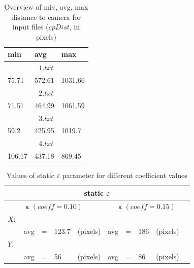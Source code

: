 \begin{table}[htb!]
	\caption{Overview of miv, avg, max distance to camera for input files ($cpDist$, in pixels)}
	\label{table:cp_dist_res}
	
	\setlength{\tabcolsep}{10pt}
	\centering
	
	\begin{tabular}[c]{||C{2cm} C{2cm} C{2cm}||}
		\hline
		min 	& avg	& max 	\\ [2ex]
		\hline
		 \\[2ex]
		75.71	& 572.61	& 1031.66	\\[0.5ex]
		\hline
		
		 \\[2ex]
		71.51	& 464.99	& 1061.59	\\[0.5ex]
		\hline
		
		 \\[2ex]
		59.2	& 425.95	& 1019.7	\\[0.5ex]
		\hline
		
		 \\[2ex]
		106.17	& 437.18	& 869.45	\\[0.5ex]
		\hline
	\end{tabular}
\end{table}

\begin{table}[htb!]
	\caption{Values of static $\varepsilon$ parameter for different coefficient values}
	\label{table:eps_st}
	
	\setlength{\tabcolsep}{10pt}
	\centering
	
	\begin{tabular}
		{||lllll|lllll||}
		\multicolumn{10}{c}{static $\varepsilon$} \\[0.5ex]
		\hline
		\multicolumn{5}{||c}{$\bm{\varepsilon}\ (coeff = 0.10)$} & \multicolumn{5}{c||}{$\bm{\varepsilon}\ (coeff = 0.15)$} \\[0.5ex]
		$X:$       			& & & & & & & & & \\[0.5ex]
		& avg 	& = 	& 123.7 	& (pixels) & avg 	& = 	& 186 	& (pixels) &\\[0.5ex]
		$Y:$       			& & & & & & & & & \\[0.5ex]
		& avg 	& = 	& 56	 	& (pixels) & avg 	& = 	& 86 	& (pixels) &\\[0.5ex]
		\hline
	\end{tabular}
\end{table}

